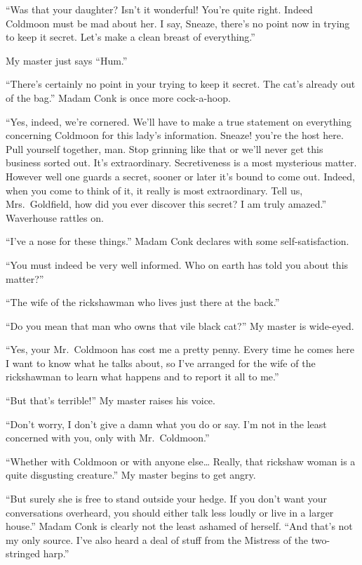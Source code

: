 \documentclass{book}
\begin{document}
``Was that your daughter? Isn't it wonderful! You're quite right. Indeed
Coldmoon must be mad about her. I say, Sneaze, there's no point now in
trying to keep it secret. Let's make a clean breast of everything.''

My master just says ``Hum.''

``There's certainly no point in your trying to keep it secret. The cat's
already out of the bag.'' Madam Conk is once more cock-a-hoop.

``Yes, indeed, we're cornered. We'll have to make a true statement on
everything concerning Coldmoon for this lady's information. Sneaze!
you're the host here. Pull yourself together, man. Stop grinning like
that or we'll never get this business sorted out. It's extraordinary.
Secretiveness is a most mysterious matter. However well one guards a
secret, sooner or later it's bound to come out. Indeed, when you come to
think of it, it really is most extraordinary. Tell us, Mrs.~Goldfield,
how did you ever discover this secret? I am truly amazed.'' Waverhouse
rattles on.

``I've a nose for these things.'' Madam Conk declares with some
self-satisfaction.

``You must indeed be very well informed. Who on earth has told you about
this matter?''

``The wife of the rickshawman who lives just there at the back.''

``Do you mean that man who owns that vile black cat?'' My master is
wide-eyed.

``Yes, your Mr.~Coldmoon has cost me a pretty penny. Every time he comes
here I want to know what he talks about, so I've arranged for the wife
of the rickshawman to learn what happens and to report it all to me.''

``But that's terrible!'' My master raises his voice.

``Don't worry, I don't give a damn what you do or say. I'm not in the
least concerned with you, only with Mr.~Coldmoon.''

``Whether with Coldmoon or with anyone else\ldots{} Really, that
rickshaw woman is a quite disgusting creature.'' My master begins to get
angry.

``But surely she is free to stand outside your hedge. If you don't want
your conversations overheard, you should either talk less loudly or live
in a larger house.'' Madam Conk is clearly not the least ashamed of
herself. ``And that's not my only source. I've also heard a deal of
stuff from the Mistress of the two-stringed harp.''
\end{document}

